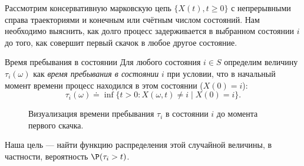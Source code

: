 Рассмотрим консервативную марковскую цепь $\{X(t), t \geqslant 0\}$ с непрерывными справа траекториями и конечным или счётным числом состояний. Нам необходимо выяснить, как долго процесс задерживается в выбранном состоянии $i$ до того, как совершит первый скачок в любое другое состояние.

\begin{definition}{Время пребывания в состоянии}
    Для любого состояния $i \in S$ определим величину $\tau_i(\omega)$ как \textit{время пребывания в состоянии} $i$ при условии, что в начальный момент времени процесс находился в этом состоянии ($X(0) = i$):
    \[
        \tau_i(\omega) \doteq \inf \{t > 0 : X(\omega, t) \ne i \mid X(0) = i\}.
    \]
\end{definition}

\begin{figure}[h!]
    \centering
    \caption{Визуализация времени пребывания $\tau_i$ в состоянии $i$ до момента первого скачка.}
\end{figure}

Наша цель — найти функцию распределения этой случайной величины, в частности, вероятность $\P(\tau_i > t)$.

